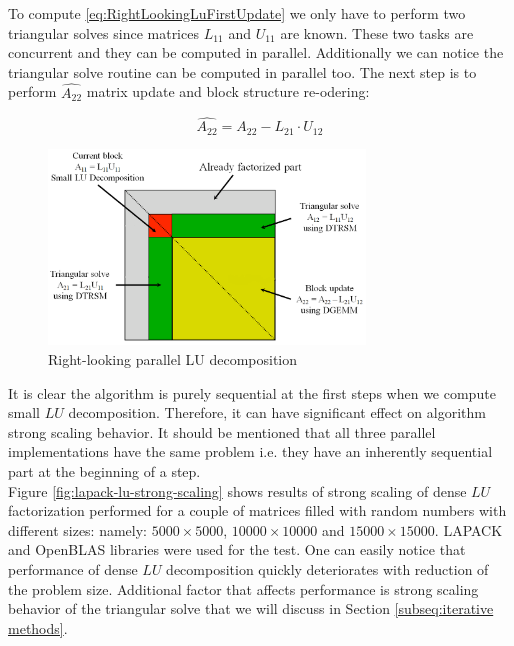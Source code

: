 To compute \ref{eq:RightLookingLuFirstUpdate} we only have to perform two triangular solves since matrices $L_{11}$ and $U_{11}$ are known. These two tasks are concurrent and they can be computed in parallel. Additionally we can notice the triangular solve routine can be computed in parallel too. The next step is to perform $\hat{A_{22}}$ matrix update and block structure re-odering:

\begin{equation} \label{eq:RightLookingLuSecondUpdate}
\hat{A_{22}} = A_{22} - L_{21} \cdot U_{12}
\end{equation}

\figpointer{\ref{fig:RightLookingLuReodering}}
\begin{figure}[htpb]
  \centering
  \includegraphics[width=0.75\textwidth]{figures/chapter-2/right-looking-la.png}
\caption{Right-looking parallel LU decomposition}
\label{fig:RightLookingLuReodering}
\end{figure}


It is clear the algorithm is purely sequential at the first steps when we compute small $LU$ decomposition. Therefore, it can have significant effect on algorithm strong scaling behavior. It should be mentioned that all three parallel implementations have the same problem i.e. they have an inherently sequential part at the beginning of a step. \\

Figure \ref{fig:lapack-lu-strong-scaling} shows results of strong scaling of dense $LU$ factorization performed for a couple of matrices filled with random numbers with different sizes: namely: $5000 \times 5000$, $10000 \times 10000$ and $15000 \times 15000$. LAPACK and OpenBLAS libraries were used for the test. One can easily notice that performance of dense $LU$ decomposition quickly deteriorates with reduction of the problem size. Additional factor that affects performance is strong scaling behavior of the triangular solve that we will discuss in Section \ref{subseq:iterative methods}. 

